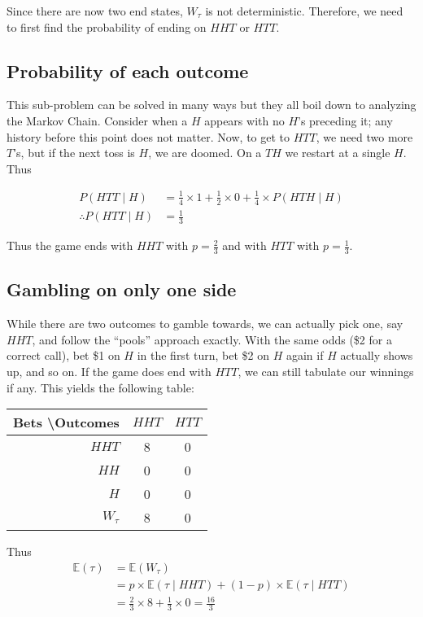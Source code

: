 \documentclass[11pt]{article}
\newcommand{\E}{\mathbb{E}}
\begin{document}
Since there are now two end states, $W_\tau$ is not deterministic. Therefore, we need to first find the probability of ending on $HHT$ or $HTT$.

\subsection{Probability of each outcome}
This sub-problem can be solved in many ways but they all boil down to analyzing the Markov Chain. Consider when a $H$ appears with no $H$'s preceding it; any history before this point does not matter. Now, to get to $HTT$, we need two more $T$'s, but if the next toss is $H$, we are doomed. On a $TH$ we restart at a single $H$. Thus 

\begin{align*}
P(HTT\mid H) &= \frac{1}{4} \times 1 + \frac{1}{2} \times 0 + \frac{1}{4} \times P(HTH\mid H) \\
\therefore P(HTT\mid H) &= \frac{1}{3}
\end{align*}

Thus the game ends with $HHT$ with $p=\frac{2}{3}$ and with $HTT$ with $p=\frac{1}{3}$.

\subsection{Gambling on only one side}
While there are two outcomes to gamble towards, we can actually pick one, say $HHT$, and follow the ``pools'' approach exactly. With the same odds (\$2 for a correct call), bet \$1 on $H$ in the first turn, bet \$2 on $H$ again if $H$ actually shows up, and so on. If the game does end with $HTT$, we can still tabulate our winnings if any. This yields the following table:

\begin{center}
  \begin{tabular}{ |r|c|c| } 
   \hline
   Bets \textbackslash Outcomes & $HHT$ & $HTT$ \\ \hline 
   $HHT$ & 8 & 0 \\ 
   $HH$ & 0 & 0 \\ 
   $H$ & 0 & 0 \\ \hline
   $W_\tau$ & 8 & 0 \\
   \hline
  \end{tabular}
\end{center}

Thus 
\begin{align*}
\E(\tau) &= \E(W_\tau) \\
&= p\times \E(\tau\mid HHT) + (1-p)\times \E(\tau\mid HTT) \\
&=\frac{2}{3} \times 8 + \frac{1}{3} \times 0 = \boxed{\frac{16}{3}}
\end{align*}
\end{document}
